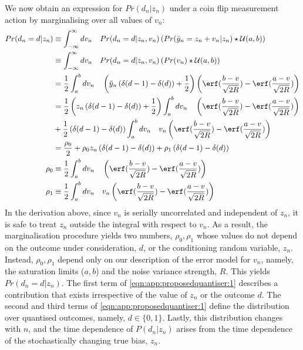We now obtain an expression for $Pr(d_n | z_n)$ under a coin flip measurement action by marginalising over all values of $v_n$:
 \begin{align}
 Pr(d_n=d | z_n) & \equiv  \int_{-\infty}^{\infty} dv_n \quad  Pr(d_n=d | z_n, v_n) \left( Pr( \tilde{y}_n = z_n + v_n| z_n) \star \mathcal{U}(a,b) \right)  \\
 & \equiv  \int_{-\infty}^{\infty} dv_n \quad  Pr(d_n=d | z_n, v_n) \left( Pr( v_n) \star \mathcal{U}(a,b) \right)  \\
 & = \frac{1}{2} \int_{a}^{b} dv_n \quad  \left( \tilde{y}_n \left( \delta(d-1) - \delta(d) \right)  + \frac{1}{2} \right) 
  \left(\erf(\frac{b-v}{\sqrt{2R}}) - \erf(\frac{a-v}{\sqrt{2R}})\right) \\
 & = \frac{1}{2} \left( z_n \left( \delta(d-1) - \delta(d) \right)  + \frac{1}{2} \right)  \int_{a}^{b} dv_n \quad
 \left(\erf(\frac{b-v}{\sqrt{2R}}) - \erf(\frac{a-v}{\sqrt{2R}})\right) \nonumber\\
  & + \frac{1}{2}  \left( \delta(d-1) - \delta(d) \right) \int_{a}^{b} dv_n \quad  v_n  
  \left(\erf(\frac{b-v}{\sqrt{2R}}) - \erf(\frac{a-v}{\sqrt{2R}})\right) \\
  & =  \frac{\rho_0}{2}  + \rho_0 z_n \left( \delta(d-1) - \delta(d) \right)  + \rho_1 \left( \delta(d-1) - \delta(d) \right) \label{eqn:app:proposedquantiser:1} \\
\rho_0 & \equiv  \frac{1}{2}  \int_{a}^{b} dv_n \quad
\left(\erf(\frac{b-v}{\sqrt{2R}}) - \erf(\frac{a-v}{\sqrt{2R}})\right) \\
\rho_1 & \equiv \frac{1}{2}  \int_{a}^{b} dv_n \quad  v_n  
\left(\erf(\frac{b-v}{\sqrt{2R}}) - \erf(\frac{a-v}{\sqrt{2R}})\right)
 \end{align}
In the derivation above, since $v_n$ is serially uncorrelated and independent of $z_n$, it is safe to treat $z_n$ outside the integral with respect to $v_n$. As a result, the marginalisation procedure yields two numbers, $\rho_0, \rho_1$ whose values do not depend on the outcome under consideration, $d$, or the conditioning random variable, $z_n$. Instead, $\rho_0, \rho_1$ depend only on our description of the error model for $v_n$, namely, the saturation limits ($a, b$) and the noise variance strength, $R$. 
This yields $ Pr(d_n=d | z_n) $. The first term of \cref{eqn:app:proposedquantiser:1} describes a contribution that exists irrespective of the value of $z_n$ or the outcome $d$. The second and third terms of \cref{eqn:app:proposedquantiser:1} define the  distribution over quantised outcomes, namely, $d \in \{ 0, 1\}$.  Lastly, this distribution changes with $n$, and the time dependence of $P(d_n|z_n)$ arises from the time dependence of the stochastically changing true bias, $z_n$. 

